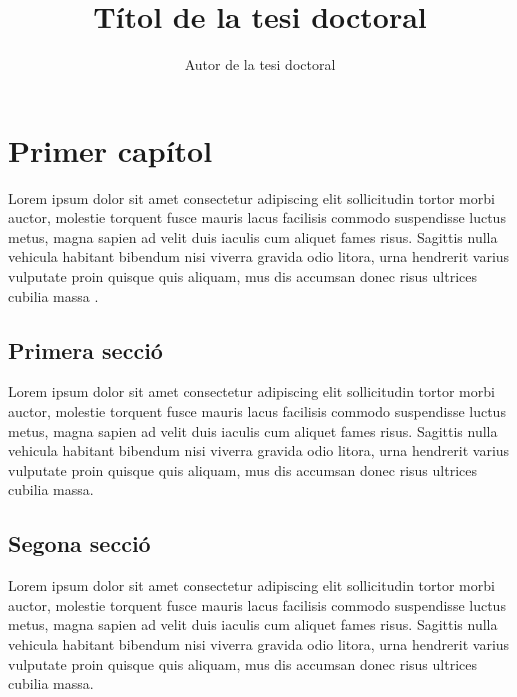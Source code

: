 \documentclass{uathesis-va}
\title{Títol de la tesi doctoral}
\author{Autor de la tesi doctoral}
\begin{document}
\maketitle

\tableofcontents



\chapter{Primer capítol}

Lorem ipsum dolor sit amet consectetur adipiscing elit sollicitudin tortor morbi auctor, molestie torquent fusce mauris lacus facilisis commodo suspendisse luctus metus, magna sapien ad velit duis iaculis cum aliquet fames risus. Sagittis nulla vehicula habitant bibendum nisi viverra gravida odio litora, urna hendrerit varius vulputate proin quisque quis aliquam, mus dis accumsan donec risus ultrices cubilia massa \cite{uathesis-latex}.

\section{Primera secció}

Lorem ipsum dolor sit amet consectetur adipiscing elit sollicitudin tortor morbi auctor, molestie torquent fusce mauris lacus facilisis commodo suspendisse luctus metus, magna sapien ad velit duis iaculis cum aliquet fames risus. Sagittis nulla vehicula habitant bibendum nisi viverra gravida odio litora, urna hendrerit varius vulputate proin quisque quis aliquam, mus dis accumsan donec risus ultrices cubilia massa.

\section{Segona secció}

Lorem ipsum dolor sit amet consectetur adipiscing elit sollicitudin tortor morbi auctor, molestie torquent fusce mauris lacus facilisis commodo suspendisse luctus metus, magna sapien ad velit duis iaculis cum aliquet fames risus. Sagittis nulla vehicula habitant bibendum nisi viverra gravida odio litora, urna hendrerit varius vulputate proin quisque quis aliquam, mus dis accumsan donec risus ultrices cubilia massa.
\end{document}

